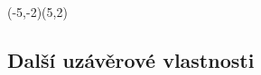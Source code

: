 \documentclass[10pt, a4paper, titlepage]{article}
\theoremstyle{note}
\begin{document}
\begin{center}
\begin{VCPicture}{(-5,-2)(5,2)}
\FixStateDiameter{3cm} 
\FixStateDiameter{0.3cm} 


\end{VCPicture}
\end{center}

\subsection{Další uzávěrové vlastnosti}
\end{document}
